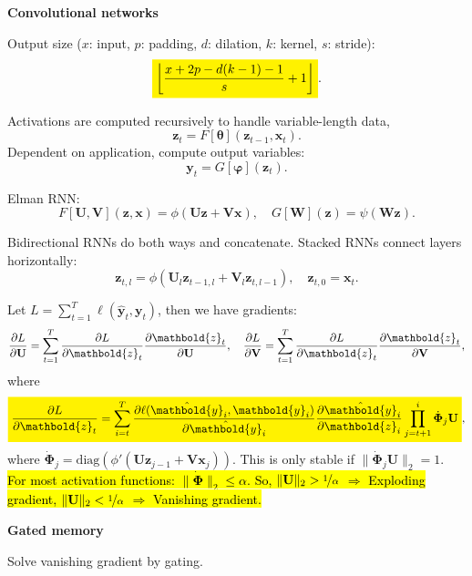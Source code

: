 \documentclass[10pt]{article}
\newenvironment{topic}[1]
{\textbf{\sffamily \footnotesize \colorbox{black}{\rlap{\textbf{\textcolor{white}{#1}}}\hspace{\linewidth}\hspace{-2\fboxsep}}}}
{}
\newenvironment{subtopic}[1]
{\begin{center}\textbf{\footnotesize \sffamily #1}\end{center}}
{}
\renewcommand{\mat}[1]{\ensuremath{\mathbf{#1}}}
\renewcommand{\vec}[1]{\ensuremath{\mathbold{#1}}}
\begin{document}
\begin{multicols*}{3}
\begin{topic}{Convolutional networks}
\begin{subtopic}{Convolutional networks}
            Output size ($x$: input, $p$: padding, $d$: dilation, $k$: kernel, $s$: stride): \[
                \colorbox{yellow}{$\displaystyle \lft\lfloor \frac{x+2p-d(k-1)-1}{s} + 1 \rgt\rfloor$}.
            \]
            
        \end{subtopic}

    \end{topic}

    \begin{topic}{Recurrent neural networks}
        Activations are computed recursively to handle variable-length data, \[
            \vec{z}_t = F[\vec{\theta}](\vec{z}_{t-1},\vec{x}_t).
        \]
        Dependent on application, compute output variables: \[
            \vec{y}_t = G[\vec{\varphi}](\vec{z}_t).
        \]

        Elman RNN: \[
            F[\mat{U},\mat{V}](\vec{z},\vec{x}) = \phi(\mat{U}\vec{z} + \mat{V}\vec{x}), \quad G[\mat{W}](\vec{z}) = \psi(\mat{W}\vec{z}).
        \]

        Bidirectional RNNs do both ways and concatenate. Stacked RNNs connect layers horizontally: \[
            \vec{z}_{t,l} = \phi(\mat{U}_l \vec{z}_{t-1,l} + \mat{V}_l \vec{z}_{t,l-1}), \quad \vec{z}_{t,0} = \vec{x}_t.
        \]

        Let $L = \sum_{t=1}^{T} \ell(\hat{\vec{y}}_t, \vec{y}_t)$, then we have gradients: \[
            \pdv{L}{\mat{U}} = \sum_{t=1}^{T} \pdv{L}{\vec{z}_t} \pdv{\vec{z}_t}{\mat{U}}, \quad \pdv{L}{\mat{V}} = \sum_{t=1}^{T} \pdv{L}{\vec{z}_t} \pdv{\vec{z}_t}{\mat{V}},
        \]
        where \[
            \colorbox{yellow}{$\displaystyle \pdv{L}{\vec{z}_t} = \sum_{i=t}^{T} \pdv{\ell(\hat{\vec{y}}_i, \vec{y}_i)}{\hat{\vec{y}}_i} \pdv{\hat{\vec{y}}_i}{\vec{z}_i} \prod_{j=t+1}^i \dot{\mat{\Phi}}_j \mat{U}$},
        \]
        where $\dot{\mat{\Phi}}_j = \mathrm{diag}(\phi'(\mat{U}\vec{z}_{j-1} + \mat{V}\vec{x}_j))$. This is only
        stable if $\| \dot{\mat{\Phi}}_j \mat{U} \|_2 = 1$. \hl{For most activation functions: $\| \dot{\mat{\Phi}} \|_2 \leq
            \alpha$. So, $\| \mat{U} \|_2 > \nicefrac{1}{\alpha}$ $\Rightarrow$ Exploding gradient,
        $\| \mat{U} \|_2 < \nicefrac{1}{\alpha}$ $\Rightarrow$ Vanishing gradient.}

        \begin{subtopic}{Gated memory}
            Solve vanishing gradient by gating.


\end{subtopic}
\end{topic}
\end{multicols*}
\end{document}
